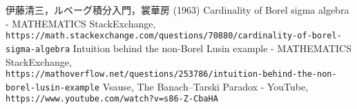 \begin{thebibliography}{99}
	 伊藤清三，ルベーグ積分入門，裳華房 (1963)
	 Cardinality of Borel sigma algebra - MATHEMATICS StackExchange,\\
		\texttt{https://math.stackexchange.com/questions/70880/cardinality-of-borel-sigma-algebra}
	 Intuition behind the non-Borel Lusin example - MATHEMATICS StackExchange,\\
		\texttt{https://mathoverflow.net/questions/253786/intuition-behind-the-non-borel-lusin-example}
	 Vsause, The Banach–Tarski Paradox - YouTube,\\\texttt{https://www.youtube.com/watch?v=s86-Z-CbaHA}
\end{thebibliography}
